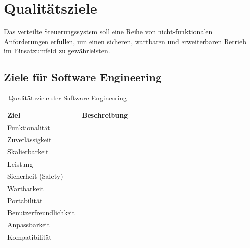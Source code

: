 \section{Qualitätsziele}

Das verteilte Steuerungssystem soll eine Reihe von nicht-funktionalen Anforderungen erfüllen, um einen sicheren, wartbaren und erweiterbaren Betrieb im Einsatzumfeld zu gewährleisten. 

\subsection{Ziele für Software Engineering}
\begin{table}[h!]
    \centering
    \begin{tabular}{p{4cm}|p{10cm}}
        \hline
        \textbf{Ziel} & \textbf{Beschreibung} \\
        \hline
        Funktionalität & 
        \\
        Zuverlässigkeit & 
        \\
        Skalierbarkeit & 
        \\
        Leistung & 
        \\
        Sicherheit (Safety) & 
        \\
        Wartbarkeit & 
        \\
        Portabilität & %
        \\
        Benutzerfreundlichkeit & %
        \\
        Anpassbarkeit & 
        \\
        Kompatibilität & 
        \\
        \hline
    \end{tabular}
    \caption{Qualitätsziele der Software Engineering}
    \label{tab:qualitaetsziele}
\end{table}

